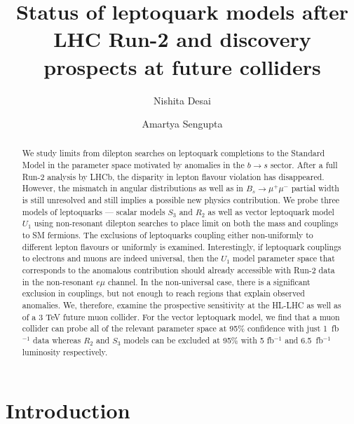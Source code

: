 \documentclass[12pt]{revtex4-2}
\numberwithin{equation}{section}
\begin{document}
\title{Status of leptoquark models after LHC Run-2 and discovery prospects at future colliders}
\author{Nishita Desai} 

\author{Amartya Sengupta}


\begin{abstract}
    We study limits from dilepton searches on leptoquark completions to the Standard Model in the parameter space motivated by anomalies in the $b \rightarrow s$ sector.  After a full Run-2 analysis by LHCb, the disparity in lepton flavour violation has disappeared. However, the mismatch in angular distributions as well as in $B_s \rightarrow \mu^+ \mu^-$ partial width is still unresolved and still implies a possible new physics contribution.  We probe three models of leptoquarks --- scalar models $S_3$ and $R_2$ as well as vector leptoquark model $U_1$ using non-resonant dilepton searches to place limit on both the mass and couplings to SM fermions.  The exclusions of leptoquarks coupling either non-uniformly to different lepton flavours or uniformly is examined. Interestingly, if leptoquark couplings to electrons and muons are indeed universal, then the $U_1$ model parameter space that corresponds to the anomalous contribution should already accessible with Run-2 data in the non-resonant $e\mu$ channel.  In the non-universal case, there is a significant exclusion in couplings, but not enough to reach regions that explain observed anomalies.  We, therefore, examine the prospective sensitivity at the HL-LHC as well as of a 3 TeV future muon collider.  For the vector leptoquark model, we find that a muon collider can probe  all of the relevant parameter space at 95\% confidence with just 1~fb$^{-1}$ data whereas $R_2$ and $S_3$ models can be excluded at 95\% with 5 fb$^{-1}$ and 6.5~fb$^{-1}$ luminosity respectively.
\end{abstract}

\maketitle


\section{Introduction}
\end{document}
